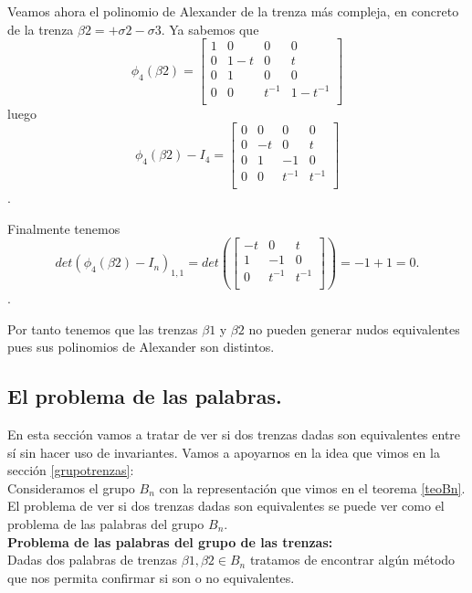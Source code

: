 \documentclass[14pt]{extarticle}
\begin{document}
Veamos ahora el polinomio de Alexander de la trenza más compleja, en concreto de la trenza $\beta2 = +\sigma2-\sigma3$. Ya sabemos que 
 \[ \phi_{4} (\beta2) = \begin{bmatrix}
 1 & 0 & 0 & 0 \\
 0 & 1-t & 0 & t \\
 0 & 1 & 0 & 0  \\	
 0 & 0 & t^{-1} & 1-t^{-1} \\
 \end{bmatrix}\]
 luego
  \[ \phi_{4} (\beta2) - I_{4} = \begin{bmatrix}
  0 & 0 & 0 & 0 \\
  0 & -t & 0 & t \\
  0 & 1 & -1 & 0  \\	
  0 & 0 & t^{-1} & t^{-1} \\
  \end{bmatrix}\].
  
  Finalmente tenemos 
    \[ det(\phi_{4} (\beta2) - I_{n})_{1,1} = det(\begin{bmatrix}
    -t & 0 & t \\
     1 & -1 & 0  \\	
     0 & t^{-1} & t^{-1} \\
    \end{bmatrix}) = -1+1 = 0.\].
    
Por tanto tenemos que las trenzas $\beta1$ y $\beta2$ no pueden generar nudos equivalentes pues sus polinomios de Alexander son distintos.\\
    


\newpage
\subsection{El problema de las palabras.}
En esta sección vamos a tratar de ver si dos trenzas dadas son equivalentes entre sí sin hacer uso de invariantes. Vamos a apoyarnos en la idea que vimos en la sección \ref{grupotrenzas}:\\

Consideramos el grupo $ B_{n} $ con la representación que vimos en el teorema \ref{teoBn}. El problema de ver si dos trenzas dadas son equivalentes se puede ver como el problema de las palabras del grupo $ B_{n} $.\\

\textbf{Problema de las palabras del grupo de las trenzas:}\\
Dadas dos palabras de trenzas $\beta1, \beta2 \in B_{n}$ tratamos de encontrar algún método que nos permita confirmar si son o no equivalentes. \\
\end{document}
